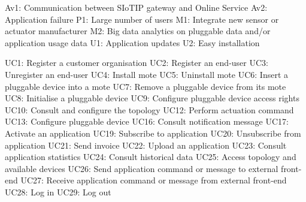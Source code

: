Av1: Communication between SIoTIP gateway and Online Service
Av2: Application failure
P1: Large number of users
M1: Integrate new sensor or actuator manufacturer
M2: Big data analytics on pluggable data and/or application usage data
U1: Application updates
U2: Easy installation

UC1: Register a customer organisation
UC2: Register an end-user
UC3: Unregister an end-user
UC4: Install mote
UC5: Uninstall mote
UC6: Insert a pluggable device into a mote
UC7: Remove a pluggable device from its mote
UC8: Initialise a pluggable device
UC9: Configure pluggable device access rights
UC10: Consult and configure the topology
UC12: Perform actuation command
UC13: Configure pluggable device
UC16: Consult notification message
UC17: Activate an application
UC19: Subscribe to application
UC20: Unsubscribe from application
UC21: Send invoice
UC22: Upload an application
UC23: Consult application statistics
UC24: Consult historical data
UC25: Access topology and available devices
UC26: Send application command or message to external front-end
UC27: Receive application command or message from external front-end
UC28: Log in
UC29: Log out

